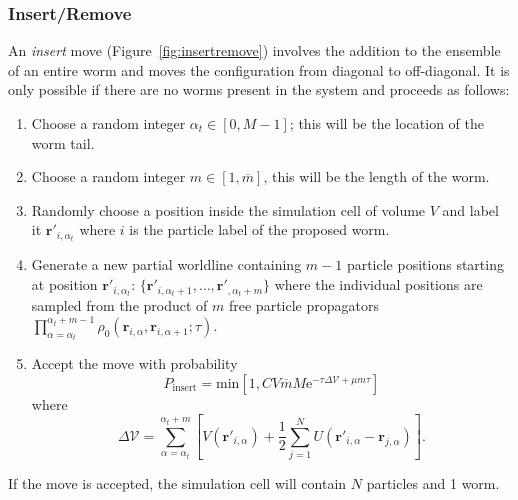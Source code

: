 \documentclass[prb,aps,amssym,nofootinbib,floatfix,notitlepage]{revtex4-1}
\renewcommand{\vec}[1]{\boldsymbol{#1}}
\newcommand{\e}[1]{\mathrm{e}^{#1}}
\begin{document}
\subsubsection{Insert/Remove}
 An \emph{insert} move (Figure~\ref{fig:insertremove}) involves the addition to
 the ensemble of an entire worm and moves the configuration from diagonal to
 off-diagonal.  It is only possible if there are no worms present in the system
 and proceeds as follows:
\begin{enumerate}
    \item Choose a random integer $\alpha_t \in [0,M-1]$; this will be the
        location of the worm tail.
    \item Choose a random integer $m \in [1,\overline{m}]$, this will be the
        length of the worm.
    \item Randomly choose a position inside the simulation cell of volume $V$
        and label it $\vec{r}'_{i,\alpha_t}$ where $i$ is the particle label of
        the proposed worm.
    \item Generate a new partial worldline containing $m-1$ particle positions
        starting at position $\vec{r}'_{i,\alpha_t}$: $\{\vec{r}'_{i,\alpha_t+1},\ldots,
    \vec{r}'_{,\alpha_t+m}\}$ where the individual positions are sampled from
    the product of $m$ free particle propagators
    $\prod_{\alpha=\alpha_t}^{\alpha_t+m-1}
    \rho_0(\vec{r}_{i,\alpha},\vec{r}_{i,\alpha+1};\tau)$.
\item Accept the move with probability
\begin{equation}
    P_{\text{insert}} = \mathrm{min} \left[1,
C V \overline{m}M \e{-\tau \Delta \mathcal{V} + \mu m \tau} \right]
\end{equation}
%
where
%
\begin{equation}
    \Delta\mathcal{V} = \sum_{\alpha=\alpha_t}^{\alpha_t+m} \left[ 
        V(\vec{r}'_{i,\alpha}) + \frac{1}{2}\sum_{j=1}^N
        U(\vec{r}'_{i,\alpha}-\vec{r}_{j,\alpha}) \right].
\end{equation}
%
\end{enumerate}
If the move is accepted, the simulation cell will contain $N$ particles and 1
worm.\\[2ex]
%
\end{document}
